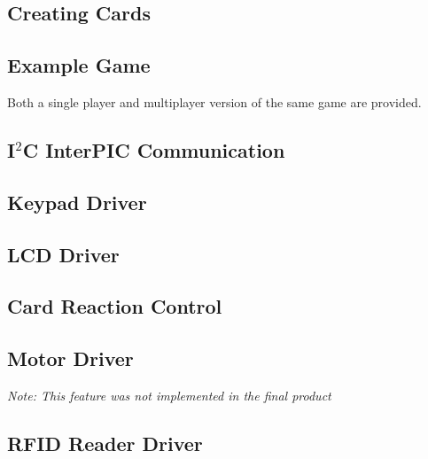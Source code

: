 \documentclass[12pt]{article} %
\begin{document}
\subsection{Creating Cards}


\subsection{Example Game}
Both a single player and multiplayer version of the same game are provided.



\subsection{I$^2$C InterPIC Communication}



\subsection{Keypad Driver}



\subsection{LCD Driver}



\subsection{Card Reaction Control}



\subsection{Motor Driver}
\textit{Note: This feature was not implemented in the final product}



\subsection{RFID Reader Driver}


\end{document}
